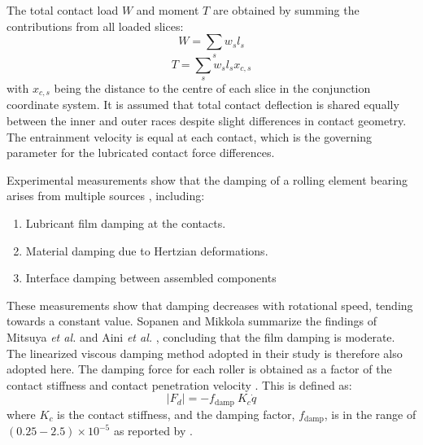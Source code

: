 The total contact load $W$ and moment $T$ are obtained by summing the contributions from all loaded slices:
\begin{equation}\label{Total contact load flexitribo}
	W=\sum_s w_s l_s
\end{equation}
\begin{equation}\label{Total contact torque flexitribo}
	T=\sum_s w_s l_s x_{c, s}
\end{equation}
with $x_{c, s}$ being the distance to the centre of each slice in the conjunction coordinate system. It is assumed that total contact deflection is shared equally between the inner and outer races despite slight differences in contact geometry. The entrainment velocity is equal at each contact, which is the governing parameter for the lubricated contact force differences.

Experimental measurements show that the damping of a rolling element bearing arises from multiple sources \cite{Dietl1997}, including:
 
\begin{enumerate}
	\item Lubricant film damping at the contacts.
	\item Material damping due to Hertzian deformations.
	\item Interface damping between assembled components
\end{enumerate}

These measurements show that damping decreases with rotational speed, tending towards a constant value. Sopanen and Mikkola \cite{Sopanen2003_1} summarize the findings of Mitsuya \textit{et al.} \cite{Mitsuya1992} and Aini \textit{et al.} \cite{Aini2002}, concluding that the film damping is moderate. The linearized viscous damping method adopted in their study is therefore also adopted here. The damping force for each roller is obtained as a factor of the contact stiffness and contact penetration velocity \cite{Kramer1993}. This is defined as:
\begin{equation}\label{Kramer damping}
	\left|F_d\right|=-f_{\text {damp }} K_c \dot{q}
\end{equation}
where $K_c$ is the contact stiffness, and the damping factor, $f_{\text {damp}}$, is in the range of $(0.25-2.5) \times 10^{-5}$ as reported by \cite{Kramer1993}.

